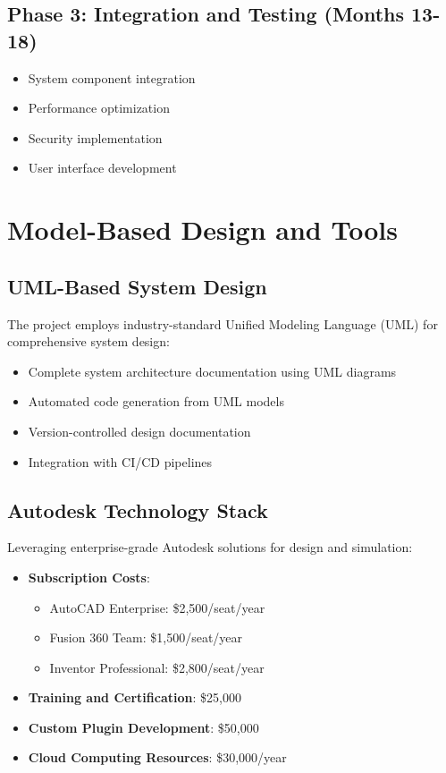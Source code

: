 \documentclass[12pt,a4paper]{article}
\begin{document}
\subsection{Phase 3: Integration and Testing (Months 13-18)}
\begin{itemize}
    \item System component integration
    \item Performance optimization
    \item Security implementation
    \item User interface development
\end{itemize}

\section{Model-Based Design and Tools}
\subsection{UML-Based System Design}
The project employs industry-standard Unified Modeling Language (UML) for comprehensive system design:
\begin{itemize}
    \item Complete system architecture documentation using UML diagrams
    \item Automated code generation from UML models
    \item Version-controlled design documentation
    \item Integration with CI/CD pipelines
\end{itemize}

\subsection{Autodesk Technology Stack}
Leveraging enterprise-grade Autodesk solutions for design and simulation:
\begin{itemize}
    \item \textbf{Subscription Costs}: 
        \begin{itemize}
            \item AutoCAD Enterprise: \$2,500/seat/year
            \item Fusion 360 Team: \$1,500/seat/year
            \item Inventor Professional: \$2,800/seat/year
        \end{itemize}
    \item \textbf{Training and Certification}: \$25,000
    \item \textbf{Custom Plugin Development}: \$50,000
    \item \textbf{Cloud Computing Resources}: \$30,000/year
\end{itemize}
\end{document}
